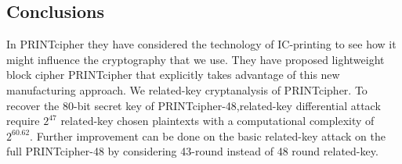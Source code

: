 \documentclass[journal=tosc,preprint]{iacrtrans}
\begin{document}
\subsection{Conclusions}
In PRINTcipher they have considered the technology of IC-printing to see how it might influence the  cryptography that we use. They have proposed lightweight block cipher PRINTcipher that explicitly takes advantage of this new manufacturing approach. We related-key cryptanalysis of PRINTcipher. To recover the 80-bit secret key of PRINTcipher-48,related-key differential attack require \(2^{47}\) related-key chosen plaintexts with a computational complexity of \(2^{60.62}\). Further improvement can be done on the basic related-key attack on the full PRINTcipher-48 by considering 43-round instead of 48 round related-key.



\newpage
\end{document}
